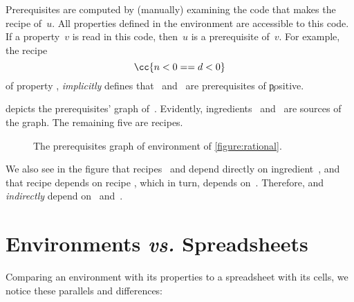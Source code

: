 Prerequisites are computed by (manually) examining the \Java code that makes
the recipe of~$u$. All properties defined in the environment are accessible to
this \Java code. If a property~$v$ is read in this code, then~$u$ is a
prerequisite of~$v$.  For example, the recipe \[
  \cc{n < 0 == d < 0}
\] of property , \emph{implicitly} defines that~ and~
are prerequisites of \c{positive}.

 depicts the prerequisites' graph
of~. Evidently, ingredients~ and~ are sources of the
graph. The remaining five are recipes.

\begin{figure}[!hb]
  \caption{\label{figure:rational:prerequisites}%
    The prerequisites graph of \Reap environment  of
    \cref{figure:rational}.
  }
  \begin{adjustbox}{max width=\columnwidth}
      
  \end{adjustbox}
\end{figure}

We also see in the figure that recipes~ and  depend directly
on ingredient~, and that recipe  depends on recipe ,
which in turn, depends on~. Therefore,  and 
\emph{indirectly} depend on~ and~.

\section{Environments \emph{vs.} Spreadsheets}
Comparing an environment with its properties to a spreadsheet with its cells,
we notice these parallels and differences:


